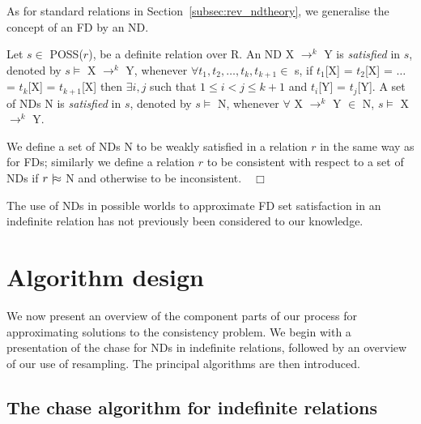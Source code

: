 As for standard relations in Section~\ref{subsec:rev_ndtheory}, we
generalise the concept of an FD by an ND. 
 

\begin{definition}\label{def:sat-nd-indef}
\begin{rm}
Let $s \in$ POSS($r$), be a definite relation over R.
An ND X $\to^k$ Y is {\em satisfied} in $s$,
denoted by $s \models$ X $\to^k$ Y, whenever
$\forall t_1, t_2, \ldots, t_k, t_{k+1} \in$ s, if 
$t_1$[X] = $t_2$[X] = $\ldots$ = $t_k$[X] = $t_{k+1}$[X] then 
$\exists i,j$ such that $1 \le i < j \le k+1$
and $t_i$[Y] = $t_j$[Y].
A set of NDs N is {\em satisfied} in $s$,
denoted by $s \models$ N, whenever
$\forall$ X $\to^k$ Y $\in$ N, $s \models$ X $\to^k$ Y.

We define a set of NDs N to be weakly satisfied in a relation $r$
in the same way as for FDs; similarly we define 
a relation $r$ to be consistent with respect to a set of NDs if
$r \mid\!\approx$ N and otherwise to be inconsistent.$\quad\Box$
\end{rm}
\end{definition}

\smallskip

The use of NDs in possible worlds to approximate FD set satisfaction
in an indefinite relation has not previously been considered to our
knowledge. 

\section{Algorithm design}\label{sec:algdes}

We now present an overview of the component parts of our process for
approximating solutions to the consistency problem. We begin with a
presentation of the chase for NDs in indefinite relations, followed by
an overview of our use of resampling.  The principal algorithms are
then introduced.

\subsection{The chase algorithm for indefinite
relations}\label{subsec:cp_ndchase}

